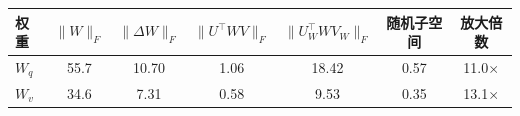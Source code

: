\begin{tabular}{l c c c c c c}
\toprule
权重 & $\|W\|_F$ & $\|\Delta W\|_F$ & $\|U^\top W V\|_F$ & $\|U_W^\top W V_W\|_F$ & 随机子空间 & 放大倍数 \\
\midrule
$W_q$ & 55.7 & 10.70 & 1.06 & 18.42 & 0.57 & 11.0$\times$ \\
$W_v$ & 34.6 & 7.31 & 0.58 & 9.53 & 0.35 & 13.1$\times$ \\
\bottomrule
\end{tabular}